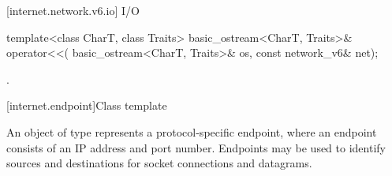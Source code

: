 [internet.network.v6.io]{ I/O}

\begin{itemdecl}
template<class CharT, class Traits>
  basic_ostream<CharT, Traits>& operator<<(
    basic_ostream<CharT, Traits>& os, const network_v6& net);
\end{itemdecl}

\begin{itemdescr}
\pnum
\returns {}.
\end{itemdescr}




%
[internet.endpoint]{Class template }

\pnum
An object of type  represents a protocol-specific endpoint, where an endpoint consists of an IP address and port number. Endpoints may be used to identify sources and destinations for socket connections and datagrams.

